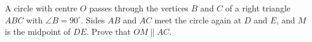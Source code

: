 A circle with centre $O$ passes through the vertices $B$ and $C$ of a right triangle $ABC$ with $\angle B=90^\circ$. Sides $AB$ and $AC$ meet the circle again at $D$ and $E$, and $M$ is the midpoint of $DE$. Prove that $OM\parallel AC$.
